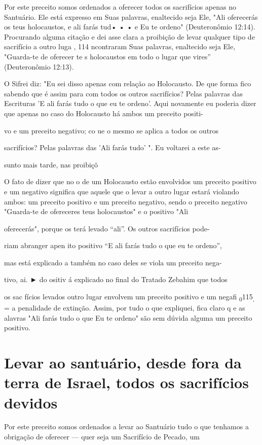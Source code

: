 Por este preceito somos ordenados a oferecer todos os sacrifícios apenas
no Santuário. Ele está expresso em Suas palavras, enaltecido seja Ele,
"Ali oferecerás os teus holocaustos, e ali farás tud• • • e Eu te
ordeno" (Deu­teronômio 12:14). Procurando alguma citação e dei asse
clara a proibição de levar qualquer tipo de sacrifício a outro luga ,
114 ncontraram Suas pala­vras, enaltecido seja Ele, "Guarda-te de
oferecer te s holocaustos em todo o lugar que vires'' (Deuteronômio
12:13).

O Sifrei diz: "Eu sei disso apenas com relação ao Holocausto. De que
forma fico sabendo que é assim para com todos os outros sacrifícios?
Pelas pa­lavras das Escrituras 'E ali farás tudo o que eu te ordeno'.
Aqui novamente eu poderia dizer que apenas no caso do Holocausto há
ambos um preceito positi-

vo e um preceito negativo; co ue o mesmo se aplica a todos os outros

sacrifícios? Pelas palavras das 'Ali farás tudo' ". Eu voltarei a este
as-

sunto mais tarde, nas proibiçõ

O fato de dizer que no o de um Holocausto estão envolvidos um preceito
positivo e um negativo significa que aquele que o levar a outro lugar
estará violando ambos: um preceito positivo e um preceito negativo,
sendo o preceito negativo "Guarda-te de ofereceres teus holocaustos" e o
positivo "Ali

oferecerás", porque os terá levado ``ali''. Os outros sacrifícios pode-

riam abranger apen ito positivo ``E ali farás tudo o que eu te ordeno'',

mas está explicado a também no caso deles se viola um preceito nega-

tivo, ai. ► do ositiv á explicado no final do Tratado
Zebahim que todos

os sac fícios levados outro lugar envolvem um preceito positivo e um
negafi \textsubscript{0}115\textsubscript{,} = a penalidade de extinção.
Assim, por tudo o que expliquei, fica claro q e as alavras "Ali farás
tudo o que Eu te ordeno" são sem dúvida algu­ma um preceito positivo.

\section{Levar ao santuário, desde fora da terra de Israel, todos os sacrifícios devidos}

Por este preceito somos ordenados a levar ao Santuário tudo o que
tenhamos a obrigação de oferecer --- quer seja um Sacrifício de Pecado,
um


